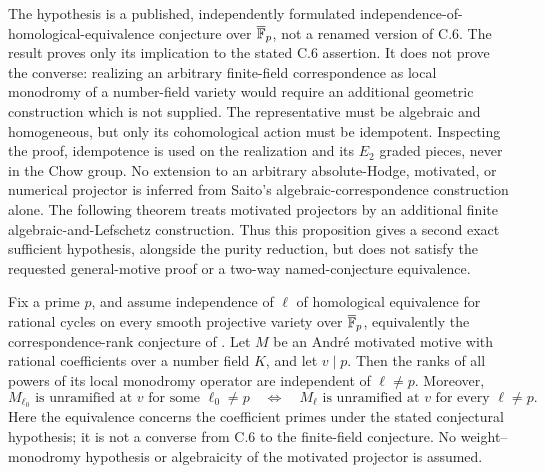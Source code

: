 \begin{remark}
\label{c:chow-rank-reduction-scope}
The hypothesis is a published, independently formulated
independence-of-homological-equivalence conjecture over
$\overline{\mathbb F}_p$, not a renamed version of C.6.
The result proves only its implication to the stated C.6 assertion.
It does not prove the converse: realizing an arbitrary finite-field
correspondence as local monodromy of a number-field variety would
require an additional geometric construction which is not supplied.
The representative must be algebraic and homogeneous, but only
its cohomological action must be idempotent. Inspecting the proof,
idempotence is used on the realization and its $E_2$ graded pieces,
never in the Chow group. No extension to an arbitrary
absolute-Hodge, motivated, or numerical projector is inferred
from Saito's algebraic-correspondence construction alone.
The following theorem treats motivated projectors by an additional
finite algebraic-and-Lefschetz construction.
Thus this proposition gives a second exact sufficient hypothesis,
alongside the purity reduction, but does not satisfy the requested
general-motive proof or a two-way named-conjecture equivalence.
\end{remark}


\begin{theorem}
\label{c:motivated-unramified-rank-reduction}
Fix a prime $p$, and assume independence of $\ell$ of homological
equivalence for rational cycles on every smooth projective variety
over $\overline{\mathbb F}_p$, equivalently the correspondence-rank
conjecture of
\citet[Theorems~4.6 and~5.1 and Corollary~5.2]{c_vandobben2020}.
Let $M$ be an Andr\'e motivated motive with rational coefficients
over a number field $K$, and let $v\mid p$.
Then the ranks of all powers of its local monodromy operator are
independent of $\ell\ne p$. Moreover,
\[
 M_{\ell_0}\text{ is unramified at }v\text{ for some }\ell_0\ne p
 \quad\Longleftrightarrow\quad
 M_\ell\text{ is unramified at }v\text{ for every }\ell\ne p.
\]
Here the equivalence concerns the coefficient primes under the
stated conjectural hypothesis; it is not a converse from C.6 to
the finite-field conjecture. No weight--monodromy hypothesis or
algebraicity of the motivated projector is assumed.
\end{theorem}

